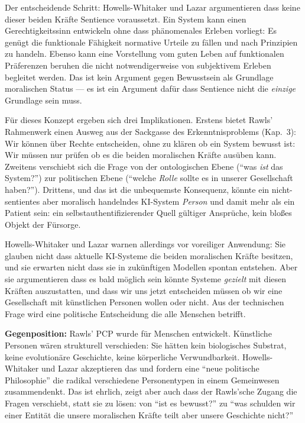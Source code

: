 \documentclass[acmlarge, noacm]{acmart}
\begin{document}
Der entscheidende Schritt: Howells-Whitaker und Lazar argumentieren dass keine dieser beiden Kräfte Sentience voraussetzt. Ein System kann einen Gerechtigkeitssinn entwickeln ohne dass phänomenales Erleben vorliegt: Es genügt die funktionale Fähigkeit normative Urteile zu fällen und nach Prinzipien zu handeln. Ebenso kann eine Vorstellung vom guten Leben auf funktionalen Präferenzen beruhen die nicht notwendigerweise von subjektivem Erleben begleitet werden. Das ist kein Argument gegen Bewusstsein als Grundlage moralischen Status --- es ist ein Argument dafür dass Sentience nicht die \textit{einzige} Grundlage sein muss.

Für dieses Konzept ergeben sich drei Implikationen. Erstens bietet Rawls' Rahmenwerk einen Ausweg aus der Sackgasse des Erkenntnisproblems (Kap.~3): Wir können über Rechte entscheiden, ohne zu klären ob ein System bewusst ist: Wir müssen nur prüfen ob es die beiden moralischen Kräfte ausüben kann. Zweitens verschiebt sich die Frage von der ontologischen Ebene (``was \textit{ist} das System?'') zur politischen Ebene (``welche \textit{Rolle} sollte es in unserer Gesellschaft haben?''). Drittens, und das ist die unbequemste Konsequenz, könnte ein nicht-sentientes aber moralisch handelndes KI-System \textit{Person} und damit mehr als ein Patient sein: ein selbstauthentifizierender Quell gültiger Ansprüche, kein bloßes Objekt der Fürsorge.

Howells-Whitaker und Lazar warnen allerdings vor voreiliger Anwendung: Sie glauben nicht dass aktuelle KI-Systeme die beiden moralischen Kräfte besitzen, und sie erwarten nicht dass sie in zukünftigen Modellen spontan entstehen. Aber sie argumentieren dass es bald möglich sein könnte Systeme \textit{gezielt} mit diesen Kräften auszustatten, und dass wir uns jetzt entscheiden müssen ob wir eine Gesellschaft mit künstlichen Personen wollen oder nicht. Aus der technischen Frage wird eine politische Entscheidung die alle Menschen betrifft.

\textbf{Gegenposition:} Rawls' PCP wurde für Menschen entwickelt. Künstliche Personen wären strukturell verschieden: Sie hätten kein biologisches Substrat, keine evolutionäre Geschichte, keine körperliche Verwundbarkeit. Howells-Whitaker und Lazar akzeptieren das und fordern eine ``neue politische Philosophie'' die radikal verschiedene Personentypen in einem Gemeinwesen zusammendenkt. Das ist ehrlich, zeigt aber auch dass der Rawls'sche Zugang die Fragen verschiebt, statt sie zu lösen: von ``ist es bewusst?'' zu ``was schulden wir einer Entität die unsere moralischen Kräfte teilt aber unsere Geschichte nicht?''
\end{document}
